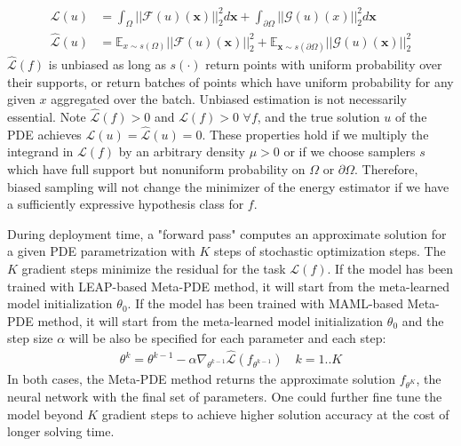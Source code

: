 \begin{align}
  \mathcal{L}(u) &= \int_{\Omega} \big|\big|\mathcal{F}(u)(\bm{x})\big|\big|^2_2 d\bm{x} +
  \int_{\partial\Omega} \big|\big|\mathcal{G}(u)(x)\big|\big|_2^2 d\bm{x} \\
  \hat{\mathcal{L}}(u) &= \mathbb{E}_{x \sim s(\Omega)} \big|\big|\mathcal{F}(u)(\bm{x})\big|\big|^2_2 +
  \mathbb{E}_{\bm{x} \sim s(\partial \Omega)} \big|\big|\mathcal{G}(u)(\bm{x})\big|\big|_2^2
\end{align}
$\hat{\mathcal{L}}(f)$ is unbiased as long as $s(\cdot)$ return points with uniform probability over their supports, or return batches of points which have uniform probability for any given $x$ aggregated over the batch. Unbiased estimation is not necessarily essential. Note $\hat{\mathcal{L}}(f) > 0$ and $\mathcal{L}(f) > 0$ $\forall f$, and the true solution $u$ of the PDE achieves $\mathcal{L}(u) = \hat{\mathcal{L}}(u) = 0$. These properties hold if we multiply the integrand in $\mathcal{L}(f)$ by an arbitrary density $\mu > 0$ or if we choose samplers $s$ which have full support but nonuniform probability on $\Omega$ or $\partial \Omega$. Therefore, biased sampling will not change the minimizer of the energy estimator if we have a sufficiently expressive hypothesis class for $f$.

During deployment time, a "forward pass" computes an approximate solution for a given PDE parametrization with $K$ steps of stochastic optimization steps. The $K$ gradient steps minimize the residual for the task $\mathcal{L}(f)$. If the model has been trained with LEAP-based Meta-PDE method, it will start from the meta-learned model initialization $\theta_0$. If the model has been trained with MAML-based Meta-PDE method, it will start from the meta-learned model initialization $\theta_0$ and the step size $\alpha$ will be also be specified for each parameter and each step: 
\begin{align}
  \theta^k = \theta^{k-1} - \alpha \nabla_{\theta^{k-1}} \hat{\mathcal{L}}(f_{\theta^{k-1}}) \quad k = 1 .. K
\end{align}
In both cases, the Meta-PDE method returns the approximate solution $f_{\theta^K}$, the neural network with the final set of parameters. One could further fine tune the model beyond $K$ gradient steps to achieve higher solution accuracy at the cost of longer solving time. 

